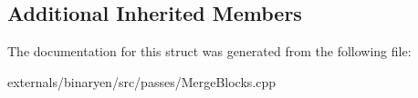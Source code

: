 \subsection*{Additional Inherited Members}


The documentation for this struct was generated from the following file\+:\begin{DoxyCompactItemize}
\item 
externals/binaryen/src/passes/Merge\+Blocks.\+cpp\end{DoxyCompactItemize}
